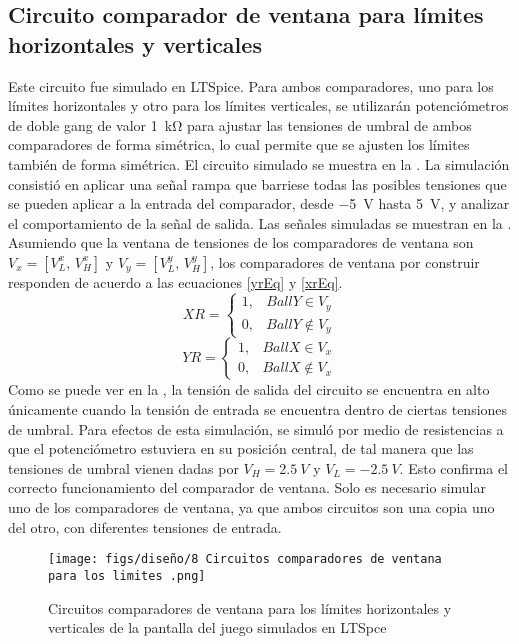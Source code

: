 \subsection{Circuito comparador de ventana para límites horizontales y verticales}
Este circuito fue simulado en LTSpice.
Para ambos comparadores, uno para los límites horizontales y otro para los límites verticales, se utilizarán potenciómetros de doble gang de valor \SI{1}{\kohm} para ajustar las tensiones de umbral de ambos comparadores de forma simétrica, lo cual permite que se ajusten los límites también de forma simétrica. 
El circuito simulado se muestra en la .
La simulación consistió en aplicar una señal rampa que barriese todas las posibles tensiones que se pueden aplicar a la entrada del comparador, desde \SI{-5}{V} hasta \SI{5}{V}, y analizar el comportamiento de la señal de salida. 
Las señales simuladas se muestran en la .
Asumiendo que la ventana de tensiones de los comparadores de ventana son $V_x = [V_L^x,\,V_H^x]$ y $V_y = [V_L^y,\,V_H^y]$, los comparadores de ventana por construir responden de acuerdo a las ecuaciones \eqref{yrEq} y \eqref{xrEq}.
\begin{equation}
    XR = \begin{cases}
        1, & BallY\in V_y\\
        0, & BallY\notin V_y
    \end{cases}\label{yrEq}
\end{equation}
\begin{equation}
    YR = \begin{cases}
        1, & BallX\in V_x\\
        0, & BallX\notin V_x
    \end{cases}\label{xrEq}
\end{equation}
Como se puede ver en la , la tensión de salida del circuito se encuentra en alto únicamente cuando la tensión de entrada se encuentra dentro de ciertas tensiones de umbral.
Para efectos de esta simulación, se simuló por medio de resistencias a que el potenciómetro estuviera en su posición central, de tal manera que las tensiones de umbral vienen dadas por $V_H = \SI{2.5}{V}$ y $V_L = \SI{-2.5}{V}$.
Esto confirma el correcto funcionamiento del comparador de ventana.
Solo es necesario simular uno de los comparadores de ventana, ya que ambos circuitos son una copia uno del otro, con diferentes tensiones de entrada.

\begin{figure}[H]
    \centering
    \texttt{[image: figs/diseño/8 Circuitos comparadores de ventana para los limites .png]}
    \caption{Circuitos comparadores de ventana para los límites horizontales y verticales de la pantalla
del juego simulados en LTSpce}
    \label{ComparadorLimites}
\end{figure}

